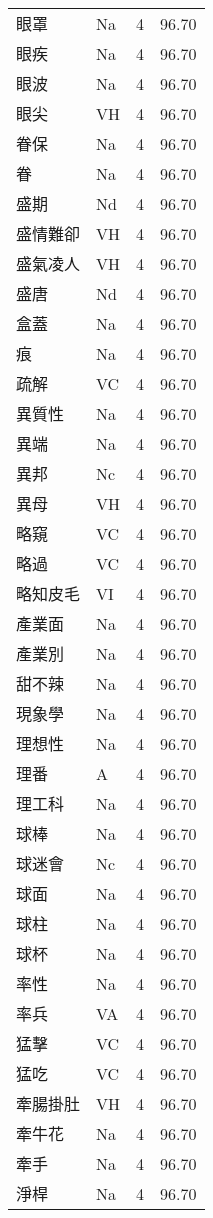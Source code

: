 \documentclass[twocolumn]{book}
\begin{document}
\begin{supertabular}{llrr}
眼罩 & Na & 4 &  96.70\\
眼疾 & Na & 4 &  96.70\\
眼波 & Na & 4 &  96.70\\
眼尖 & VH & 4 &  96.70\\
眷保 & Na & 4 &  96.70\\
眷 & Na & 4 &  96.70\\
盛期 & Nd & 4 &  96.70\\
盛情難卻 & VH & 4 &  96.70\\
盛氣凌人 & VH & 4 &  96.70\\
盛唐 & Nd & 4 &  96.70\\
盒蓋 & Na & 4 &  96.70\\
痕 & Na & 4 &  96.70\\
疏解 & VC & 4 &  96.70\\
異質性 & Na & 4 &  96.70\\
異端 & Na & 4 &  96.70\\
異邦 & Nc & 4 &  96.70\\
異母 & VH & 4 &  96.70\\
略窺 & VC & 4 &  96.70\\
略過 & VC & 4 &  96.70\\
略知皮毛 & VI & 4 &  96.70\\
產業面 & Na & 4 &  96.70\\
產業別 & Na & 4 &  96.70\\
甜不辣 & Na & 4 &  96.70\\
現象學 & Na & 4 &  96.70\\
理想性 & Na & 4 &  96.70\\
理番 & A & 4 &  96.70\\
理工科 & Na & 4 &  96.70\\
球棒 & Na & 4 &  96.70\\
球迷會 & Nc & 4 &  96.70\\
球面 & Na & 4 &  96.70\\
球柱 & Na & 4 &  96.70\\
球杯 & Na & 4 &  96.70\\
率性 & Na & 4 &  96.70\\
率兵 & VA & 4 &  96.70\\
猛擊 & VC & 4 &  96.70\\
猛吃 & VC & 4 &  96.70\\
牽腸掛肚 & VH & 4 &  96.70\\
牽牛花 & Na & 4 &  96.70\\
牽手 & Na & 4 &  96.70\\
淨桿 & Na & 4 &  96.70\\

\end{supertabular}
\end{document}

